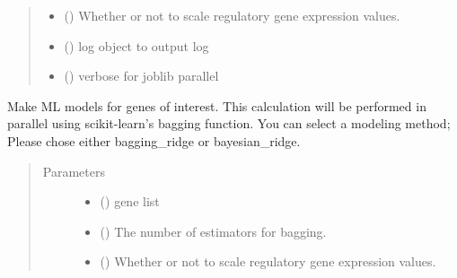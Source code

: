\documentclass[letterpaper,10pt,english]{sphinxmanual}
\begin{document}
\begin{fulllineitems}
\begin{fulllineitems}
\begin{quote}
\begin{description}
\begin{itemize}
\item {} 
 () \textendash{} Whether or not to scale regulatory gene expression values.

\item {} 
 () \textendash{} log object to output log

\item {} 
 () \textendash{} verbose for joblib parallel

\end{itemize}

\end{description}\end{quote}

\end{fulllineitems}


\begin{fulllineitems}
\label{\detokenize{modules/celloracle:celloracle.Net.fit_genes}}
Make ML models for genes of interest.
This calculation will be performed in parallel using scikit-learn’s bagging function.
You can select a modeling method; Please chose either bagging\_ridge or bayesian\_ridge.
\begin{quote}\begin{description}
\item[{Parameters}] \leavevmode\begin{itemize}
\item {} 
 () \textendash{} gene list

\item {} 
 () \textendash{} The number of estimators for bagging.

\item {} 
 () \textendash{} Whether or not to scale regulatory gene expression values.


\end{itemize}
\end{description}
\end{quote}
\end{fulllineitems}
\end{fulllineitems}
\end{document}
